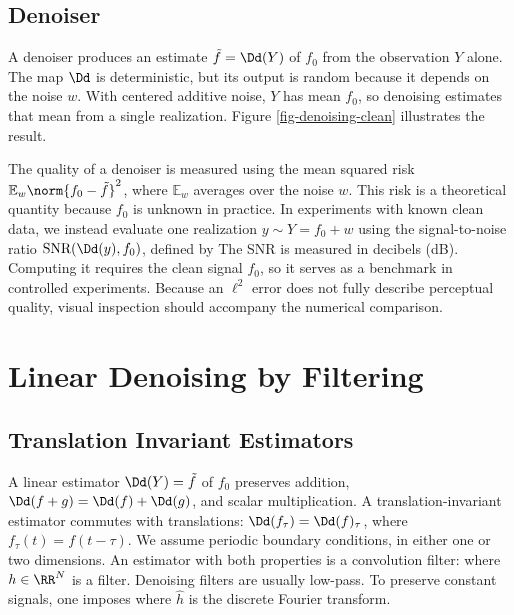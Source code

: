 \subsection{Denoiser}

A denoiser produces an estimate $\tilde f = \Dd(Y)$ of $f_0$ from the observation $Y$ alone. The map $\Dd$ is deterministic, but its output is random because it depends on the noise $w$. With centered additive noise, $Y$ has mean $f_0$, so denoising estimates that mean from a single realization. Figure \ref{fig-denoising-clean} illustrates the result.

The quality of a denoiser is measured using the mean squared risk $\mathbb E_w\norm{f_0-\tilde f}^2$,
where $\mathbb E_w$ averages over the noise $w$. This risk is a theoretical quantity because $f_0$ is unknown in practice. In experiments with known clean data, we instead evaluate one realization $y \sim Y = f_0 + w$ using the signal-to-noise ratio $\text{SNR}(\Dd(y),f_0)$, defined by
%
The SNR is measured in decibels (dB). Computing it requires the clean signal $f_0$, so it serves as a benchmark in controlled experiments. Because an $\ell^2$ error does not fully describe perceptual quality, visual inspection should accompany the numerical comparison.




\section{Linear Denoising by Filtering}
\label{sec-linear-denoising}

\subsection{Translation Invariant Estimators}

A linear estimator $\Dd(Y) = \tilde f$ of $f_0$ preserves addition, $\Dd(f+g) = \Dd(f)+\Dd(g)$, and scalar multiplication.
A translation-invariant estimator commutes with translations: $\Dd(f_\tau) = \Dd(f)_\tau$, where $f_\tau(t) = f(t-\tau)$. We assume periodic boundary conditions, in either one or two dimensions.
%
An estimator with both properties is a convolution filter:
where $h\in\RR^N$ is a filter. Denoising filters are usually low-pass. To preserve constant signals, one imposes
where $\hat h$ is the discrete Fourier transform. 

